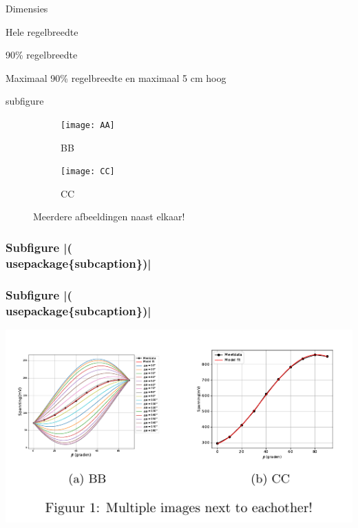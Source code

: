 \documentclass[presentatie.tex]{subfiles}
\begin{document}
\begin{frame}{Dimensies}
	\begin{noindentlist}\setlength{\itemsep}{20pt}
		\item Hele regelbreedte\\
		
		
		\item 90\% regelbreedte\\
		
		\item Maximaal 90\% regelbreedte en maximaal 5 cm hoog
	\end{noindentlist}
\end{frame}

\begin{saveblock}{subfigure}
	\begin{highlightblock}[linewidth=0.95\textwidth,framexleftmargin=0.25em]
		\begin{figure}[htbp]
			\centering
			\begin{subfigure}[b]{0.45\textwidth}
				\texttt{[image: AA]}
				\caption{BB}
				\label{fig:dphiExample}
			\end{subfigure}\qquad
			\begin{subfigure}[b]{0.45\textwidth}
				\texttt{[image: CC]}
				\caption{CC}
				\label{fig:fitExample}
			\end{subfigure}
			\caption{Meerdere afbeeldingen naast elkaar!}
		\end{figure}
	\end{highlightblock}
\end{saveblock}


\begin{frame}
	\frametitle{Subfigure \hll|(\\usepackage\{subcaption\})|}

\end{frame}

\begin{frame}
	\frametitle{Subfigure \hll|(\\usepackage\{subcaption\})|}

	\centering
	\includegraphics[width=\textwidth,height=0.8\textheight,keepaspectratio]{assets/4_Abeeldingen/outdir/subfigure}
\end{frame}
\end{document}
